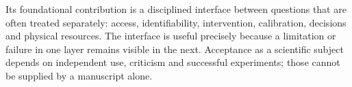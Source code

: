 Its foundational contribution is a disciplined interface between questions that are often treated separately: access, identifiability, intervention, calibration, decisions and physical resources. The interface is useful precisely because a limitation or failure in one layer remains visible in the next. Acceptance as a scientific subject depends on independent use, criticism and successful experiments; those cannot be supplied by a manuscript alone.
